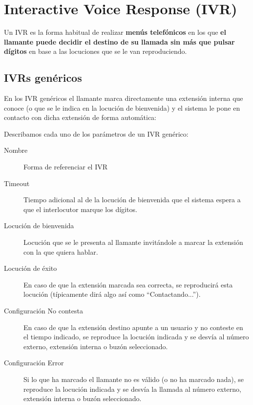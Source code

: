 \documentclass[letterpaper,10pt,spanish]{sphinxmanual}
\begin{document}
\section{Interactive Voice Response (IVR)}
\label{pbx_features/ivrs::doc}\label{pbx_features/ivrs:interactive-voice-response-ivr}
Un IVR es la forma habitual de realizar \textbf{menús telefónicos} en los que \textbf{el llamante puede decidir el destino de su llamada sin más que pulsar dígitos} en base a las locuciones que se le van reproduciendo.


\subsection{IVRs genéricos}
\label{pbx_features/ivrs:generic-ivrs}\label{pbx_features/ivrs:id1}
En los IVR genéricos el llamante marca directamente una extensión interna que conoce (o que se le indica en la locución de bienvenida) y el sistema le pone en contacto con dicha extensión de forma automática:

Describamos cada uno de los parámetros de un IVR genérico:
\begin{description}
\item[{Nombre}] \leavevmode{}\label{pbx_features/ivrs:term-name}
Forma de referenciar el IVR

\item[{Timeout}] \leavevmode{}\label{pbx_features/ivrs:term-timeout}
Tiempo adicional al de la locución de bienvenida que el sistema espera a que el interlocutor marque los dígitos.

\item[{Locución de bienvenida}] \leavevmode{}\label{pbx_features/ivrs:term-welcome-locution}
Locución que se le presenta al llamante invitándole a marcar la extensión con la que quiera hablar.

\item[{Locución de éxito}] \leavevmode{}\label{pbx_features/ivrs:term-success-locution}
En caso de que la extensión marcada sea correcta, se reproducirá esta locución (típicamente dirá algo así como ``Contactando...'').

\item[{Configuración No contesta}] \leavevmode{}\label{pbx_features/ivrs:term-no-answer-process}
En caso de que la extensión destino apunte a un usuario y no conteste en el tiempo indicado, se reproduce la locución indicada y se desvía al número externo, extensión interna o buzón seleccionado.

\item[{Configuración Error}] \leavevmode{}\label{pbx_features/ivrs:term-error-process}
Si lo que ha marcado el llamante no es válido (o no ha marcado nada), se reproduce la locución indicada y se desvía la llamada al número externo, extensión interna o buzón seleccionado.

\end{description}
\end{document}
